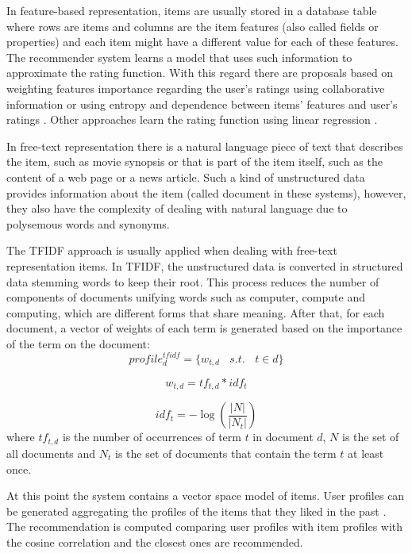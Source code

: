 \documentclass[preprint]{elsarticle}
\begin{document}
\begin{spacing}{1.5}
In feature-based representation, items are usually stored in a database table where rows are items and columns are the item features (also called fields or properties) and each item might have a different value for each of these features. The recommender system learns a model that uses such information to approximate the rating function. With this regard there are proposals based on weighting features importance regarding the user's ratings using collaborative information \cite{Symeonidis2007} or using entropy and dependence between items' features and user's ratings \cite{Castro2014}. Other approaches learn the rating function using linear regression \cite{DePessemier2016}.

In free-text representation there is a natural language piece of text that describes the item, such as movie synopsis or that is part of the item itself, such as the content of a web page or a news article. Such a kind of unstructured data provides information about the item (called document in these systems), however, they also have the complexity of dealing with natural language due to polysemous words and synonyms. 

The TFIDF approach is usually applied when dealing with free-text representation items. In TFIDF, the unstructured data is converted in structured data stemming words \cite{Porter1980} to keep their root. This process reduces the number of components of documents unifying words such as computer, compute and computing, which are different forms that share meaning. After that, for each document, a vector of weights of each term is generated based on the importance of the term on the document:
\begin{equation}
	profile^{tfidf}_{d} = \{w_{t,d}~~~~s.t.~~~~ t \in d \}
	\label{eq:document-profile-tfidf}
\end{equation}

\begin{equation}
	w_{t,d} = tf_{t,d}*idf_{t}
	\label{eq:document-profile-tfidf-term-weights}
\end{equation}

\begin{equation}
	idf_t = -\log \left( \frac{|N|}{|N_t|}\right)
	\label{eq:document-profile-tfidf-idf}
\end{equation}
\noindent where $tf_{t,d}$ is the number of occurrences of term $t$ in document $d$, $N$ is the set of all documents and $N_t$ is the set of documents that contain the term $t$ at least once.

At this point the system contains a vector space model of items. User profiles can be generated aggregating the profiles of the items that they liked in the past \cite{Symeonidis2007}. The recommendation is computed comparing user profiles with item profiles with the cosine correlation and the closest ones are recommended. 


\end{spacing}
\end{document}
